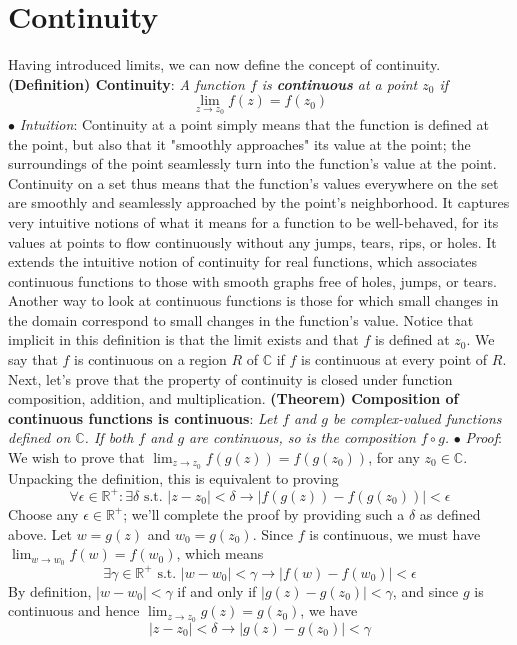 \documentclass{article}
\newcommand*{\tb}{\textbf}
\newcommand*{\ti}{\textit}
\newcommand*{\n}{\newline}
\newcommand*{\nn}{\newline \newline}
\newcommand*{\Pf}{\indent \ensuremath{\bullet} \textit{Proof}: }
\newcommand*{\In}{\indent \ensuremath{\bullet} \textit{Intuition}: }
\newcommand*{\R}{\mathbb{R}}
\newcommand*{\C}{\mathbb{C}}
\newcommand*{\st}{\text{ s.t. }}
\begin{document}
\section{Continuity}
Having introduced limits, we can now define the concept of continuity.
\nn
\tb{(Definition) Continuity}: \ti{A function $ f $ is \tb{continuous} at a point $ z_0 $ if}
$$ \lim_{z \to z_0} f(z) = f(z_0) $$
\In Continuity at a point simply means that the function is defined at the point, but also that it "smoothly approaches" its value at the point; the surroundings of the point seamlessly turn into the function's value at the point. Continuity on a set thus means that the function's values everywhere on the set are smoothly and seamlessly approached by the point's neighborhood. It captures very intuitive notions of what it means for a function to be well-behaved, for its values at points to flow continuously without any jumps, tears, rips, or holes. It extends the intuitive notion of continuity for real functions, which associates continuous functions to those with smooth graphs free of holes, jumps, or tears. Another way to look at continuous functions is those for which small changes in the domain correspond to small changes in the function's value.
\nn
Notice that implicit in this definition is that the limit exists and that $ f $ is defined at $ z_0 $. We say that $ f $ is continuous on a region $ R $ of $ \C $ if $ f $ is continuous at every point of $ R $. Next, let's prove that the property of continuity is closed under function composition, addition, and multiplication.
\nn
\tb{(Theorem) Composition of continuous functions is continuous}: \ti{Let $ f $ and $ g $ be complex-valued functions defined on $ \C $. If both $ f $ and $ g $ are continuous, so is the composition $ f \circ g $.}
\n
\Pf We wish to prove that $ \lim_{z \to z_0} f(g(z)) = f(g(z_0)) $, for any $ z_0 \in \C $. Unpacking the definition, this is equivalent to proving
$$ \forall \epsilon \in \R^+: \exists \delta \st | z - z_0 | < \delta \rightarrow | f(g(z)) - f(g(z_0)) | < \epsilon $$
Choose any $ \epsilon \in \R^+ $; we'll complete the proof by providing such a $ \delta $ as defined above. Let $ w = g(z) $ and $ w_0 = g(z_0) $. Since $ f $ is continuous, we must have $ \lim_{w \to w_0} f(w) = f(w_0) $, which means
$$ \exists \gamma \in \R^+ \st | w - w_0 | < \gamma \rightarrow | f(w) - f(w_0) | < \epsilon $$
By definition, $ | w - w_0 | < \gamma $ if and only if $ | g(z) - g(z_0) | < \gamma $, and since $ g $ is continuous and hence $ \lim_{z \to z_0} g(z) = g(z_0) $, we have
$$ | z - z_0 | < \delta \rightarrow | g(z) - g(z_0) | < \gamma $$
\end{document}
